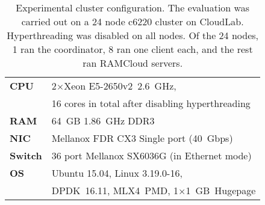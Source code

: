 \begin{table}[t]
\caption{Experimental cluster configuration. The evaluation was
carried out on a 24 node c6220 cluster on CloudLab. Hyperthreading was
disabled on all nodes. Of the 24 nodes, 1
ran the coordinator, 8 ran one client each, and the rest ran
RAMCloud servers.
}
\vspace{21pt}
\centering
\small
\begin{tabular}{p{} p{}}
\toprule
\textbf{CPU} & 2$\times$Xeon E5-2650v2~2.6~GHz,\\
        & 16 cores in total after disabling hyperthreading
\\
\midrule
\textbf{RAM} & 64~GB 1.86~GHz DDR3
\\
\midrule
\textbf{NIC} & Mellanox FDR CX3 Single port (40~Gbps)
\\
\midrule
\textbf{Switch} & 36 port Mellanox SX6036G (in Ethernet mode)
\\
\midrule
\textbf{OS} & Ubuntu 15.04, Linux 3.19.0-16,\\
        & DPDK~16.11, MLX4~PMD, 1$\times$1~GB~Hugepage
\\
\bottomrule
\end{tabular}
\label{table:rexptconfig}
\end{table}

